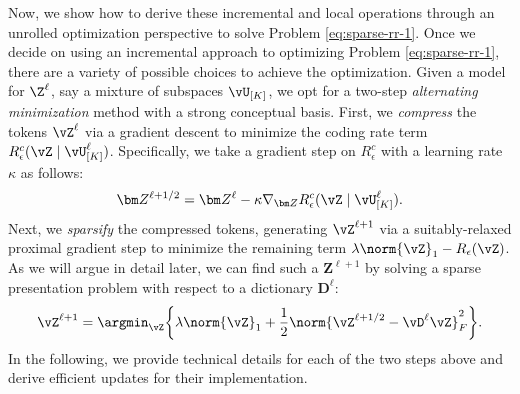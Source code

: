 \documentclass[../../book-main.tex]{subfiles}
\begin{document}
Now, we show how to derive these incremental and local operations through an unrolled optimization perspective to solve Problem \eqref{eq:sparse-rr-1}.  Once we decide on using an incremental approach to optimizing Problem
\eqref{eq:sparse-rr-1}, there are a variety of possible choices to achieve the optimization. Given a model for $\Z^\ell$, say a mixture of subspaces $\vU_{[K]}$, we opt for a two-step \textit{alternating minimization} method with a strong conceptual basis. First, we \textit{compress} the tokens $\vZ^{\ell}$ via a gradient descent to minimize the coding rate term $R^c_\epsilon (\vZ \mid \vU_{[K]}^\ell)$. Specifically, we take a gradient step on $R^c_\epsilon$ with a learning rate $\kappa$ as follows:
\begin{align}\label{eq:Z l+1/2}
    \bm Z^{\ell+1/2} = \bm Z^\ell - \kappa \nabla_{\bm Z} R^c_\epsilon (\vZ \mid \vU_{[K]}^\ell). 
\end{align}
Next, we \textit{sparsify} the compressed tokens, generating \(\vZ^{\ell + 1}\) via a suitably-relaxed proximal gradient step to minimize the remaining term $\lambda \norm{\vZ}_{1} - R_{\epsilon}(\vZ)$. As we will argue in detail later, we can find such a $\bm Z^{\ell+1}$ by solving a sparse presentation problem with respect to a dictionary $\bm D^\ell$:
\begin{equation}\label{eq:Z l+1}
  \vZ^{\ell+1} = \argmin_{{\vZ}}  \bigg\{\lambda \norm{\vZ}_1 + \frac{1}{2}\norm{\vZ^{\ell + 1/2} - \vD^{\ell} {\vZ}}_F^2\bigg\}.
\end{equation}
In the following, we provide technical details for each of the two steps above and derive efficient updates for their implementation.
\end{document}
